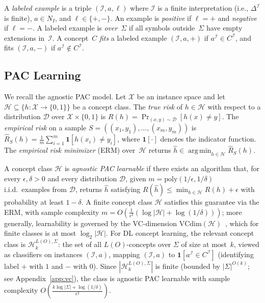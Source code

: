 \documentclass[accepted]{uai2026} %
\theoremstyle{definition}
\theoremstyle{remark}
\newcommand{\VCdim}{\mathrm{VCdim}}
\DeclareMathOperator*{\argmin}{arg\,min}
\begin{document}
A \emph{labeled example} is a triple $(\mathcal{I}, a, \ell)$ where
$\mathcal{I}$ is a finite interpretation (i.e.,
$\Delta^{\mathcal{I}}$ is finite), $a \in N_I$,
and $\ell \in \{+,-\}$.
An example is \emph{positive} if $\ell = +$ and \emph{negative} if
$\ell = -$. A labeled example is \emph{over}~$\Sigma$
if all symbols outside~$\Sigma$ have empty extensions
in~$\mathcal{I}$.
A concept~$C$ \emph{fits} a labeled example $(\mathcal{I}, a, +)$ if
$a^{\mathcal{I}} \in C^{\mathcal{I}}$, and fits
$(\mathcal{I}, a, -)$ if $a^{\mathcal{I}} \notin C^{\mathcal{I}}$.

\subsection{PAC Learning}\label{sec:prelim:pac}

We recall the agnostic PAC
model. Let $\mathcal{X}$ be an instance space
and let $\mathcal{H} \subseteq \{h : \mathcal{X} \to \{0,1\}\}$ be a
concept class. The \emph{true risk} of $h \in \mathcal{H}$ with
respect to a distribution $\mathcal{D}$ over
$\mathcal{X} \times \{0,1\}$ is
$R(h) = \Pr_{(x,y) \sim \mathcal{D}}[h(x) \neq y]$.
The \emph{empirical risk} on a sample
$S = ((x_1, y_1), \ldots, (x_m, y_m))$ is
$\hat{R}_S(h) = \frac{1}{m}\sum_{i=1}^{m} \mathbf{1}[h(x_i) \neq y_i]$,
where $\mathbf{1}[\cdot]$ denotes the indicator function.
The \emph{empirical risk minimizer} (ERM) over~$\mathcal{H}$ returns
$\hat{h} \in \argmin_{h \in \mathcal{H}} \hat{R}_S(h)$.

A concept class $\mathcal{H}$ is \emph{agnostic PAC learnable} if
there exists an algorithm that, for every $\epsilon, \delta > 0$ and
every distribution $\mathcal{D}$, given
$m = \text{poly}(1/\epsilon, 1/\delta)$ i.i.d.\ examples from
$\mathcal{D}$, returns $\hat{h}$ satisfying
$R(\hat{h}) \leq \min_{h \in \mathcal{H}} R(h) + \epsilon$
with probability at least $1-\delta$.
A finite concept class $\mathcal{H}$ satisfies this
guarantee via the ERM, with sample complexity
$m = O(\frac{1}{\epsilon^2}(\log|\mathcal{H}| +
\log(1/\delta)))$; more generally, learnability is governed by the
VC-dimension $\VCdim(\mathcal{H})$~\citep{DBLP:journals/jct/Sauer72,
DBLP:journals/jacm/BlumerEHW89}, which for finite classes is at
most $\log_2|\mathcal{H}|$.
For DL concept learning, the relevant concept class is
$\mathcal{H}_{k}^{L(O),\Sigma}$: the set of all $L(O)$-concepts
over $\Sigma$ of size at most~$k$, viewed as
classifiers on instances $(\mathcal{I}, a)$, mapping
$(\mathcal{I}, a)$ to $\mathbf{1}[a^{\mathcal{I}}
\in C^{\mathcal{I}}]$ (identifying label $+$ with $1$
and $-$ with $0$).
Since $|\mathcal{H}_{k}^{L(O),\Sigma}|$ is finite (bounded by
$|\Sigma|^{O(k)}$; see Appendix~\ref{app:vc}), the class is
agnostic PAC learnable with sample complexity
$O(\frac{k \log|\Sigma| + \log(1/\delta)}{\epsilon^2})$.
\end{document}
